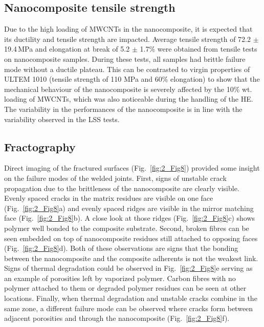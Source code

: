 \FloatBarrier
\subsection{Nanocomposite tensile strength}

Due to the high loading of MWCNTs in the nanocomposite, it is expected that its ductility and tensile strength are impacted. 
Average tensile strength of 72.2 $\pm$ \mbox{19.4\,MPa} and elongation at break of 5.2 $\pm$ 1.7\% were obtained from tensile tests on nanocomposite samples. 
During these tests, all samples had brittle failure mode without a ductile plateau. 
This can be contrasted to virgin properties of ULTEM 1010 (tensile strength of 110 MPa and 60\% elongation) to show that the mechanical behaviour of the nanocomposite is severely affected by the 10\% wt. loading of MWCNTs, which was also noticeable during the handling of the HE. 
The variability in the performances of the nanocomposite is in line with the variability observed in the LSS tests. 

\subsection{Fractography}

Direct imaging of the fractured surfaces (\mbox{Fig. \ref{fig:2_Fig8}}) provided some insight on the failure modes of the welded joints. 
First, signs of unstable crack propagation due to the brittleness of the nanocomposite are clearly visible. 
Evenly spaced cracks in the matrix residues are visible on one face (\mbox{Fig. \ref{fig:2_Fig8}}a) and evenly spaced ridges are visible in the mirror matching face (\mbox{Fig. \ref{fig:2_Fig8}}b). 
A close look at those ridges (\mbox{Fig. \ref{fig:2_Fig8}}c) shows polymer well bonded to the composite substrate. 
Second, broken fibres can be seen embedded on top of nanocomposite residues still attached to opposing faces (\mbox{Fig. \ref{fig:2_Fig8}}d). 
Both of these observations are signs that the bonding between the nanocomposite and the composite adherents is not the weakest link. 
Signs of thermal degradation could be observed in \mbox{Fig. \ref{fig:2_Fig8}}e serving as an example of porosities left by vaporized polymer. 
Carbon fibres with no polymer attached to them or degraded polymer residues can be seen at other locations. 
Finally, when thermal degradation and unstable cracks combine in the same zone, a different failure mode can be observed where cracks form between adjacent porosities and through the nanocomposite (\mbox{Fig. \ref{fig:2_Fig8}}f).

